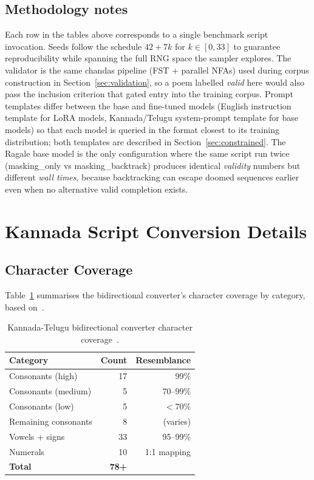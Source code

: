 \documentclass[11pt]{article}
\begin{document}
\subsection{Methodology notes}

Each row in the tables above corresponds to a single benchmark script
invocation. Seeds follow the schedule $42 + 7k$ for $k\in[0,33]$ to
guarantee reproducibility while spanning the full RNG space the sampler
explores. The validator is the same chandas pipeline (FST + parallel
NFAs) used during corpus construction in Section~\ref{sec:validation},
so a poem labelled \textit{valid} here would also pass the inclusion
criterion that gated entry into the training corpus. Prompt templates
differ between the base and fine-tuned models (English instruction
template for LoRA models, Kannada/Telugu system-prompt template for base
models) so that each model is queried in the format closest to its
training distribution; both templates are described in
Section~\ref{sec:constrained}. The Ragale base model is the only
configuration where the same script run twice (masking\_only vs
masking\_backtrack) produces identical \emph{validity} numbers but
different \emph{wall times}, because backtracking can escape doomed
sequences earlier even when no alternative valid completion exists.

\section{Kannada Script Conversion Details}
\label{app:kannada_details}

\subsection{Character Coverage}

Table~\ref{tab:kannadamap} summarises the bidirectional converter's character
coverage by category, based on~\citet{nidamarthy2021comparative}.

\begin{table}[H]
\centering
\small
\caption{Kannada-Telugu bidirectional converter character
coverage~\citep{nidamarthy2021comparative}.}
\label{tab:kannadamap}
\begin{tabular}{lrr}
\toprule
\textbf{Category} & \textbf{Count} & \textbf{Resemblance} \\
\midrule
Consonants (high)    & 17 & 99\%          \\
Consonants (medium)  &  5 & 70--99\%      \\
Consonants (low)     &  5 & $<$70\%       \\
Remaining consonants &  8 & (varies)      \\
Vowels + signs       & 33 & 95--99\%      \\
Numerals             & 10 & 1:1 mapping   \\
\midrule
\textbf{Total}       & \textbf{78+} & \\
\bottomrule
\end{tabular}
\end{table}
\end{document}
